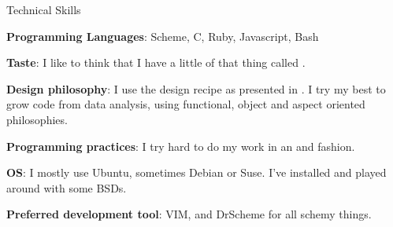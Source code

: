 \begin{rubric}{Technical Skills} 

    \entry* \textbf{Programming Languages}: Scheme, C, Ruby, Javascript, Bash

    \entry* \textbf{Taste}: I like to think that I have a little of that thing
    called .

    \entry* \textbf{Design philosophy}: I use the design recipe as presented in
    . I try my best to grow code
    from data analysis, using functional, object and aspect oriented
    philosophies. 

    \entry* \textbf{Programming practices}: I try hard to do my work in an
     and 
    fashion.

    \entry* \textbf{OS}: I mostly use Ubuntu, sometimes Debian or Suse. I've
    installed and played around with some BSDs.

    \entry* \textbf{Preferred development tool}: VIM, and DrScheme for all
    schemy things. 

\end{rubric}
